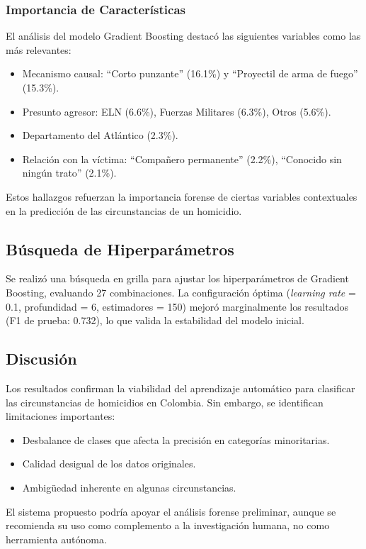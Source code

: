 \documentclass[lettersize,journal]{IEEEtran}
\begin{document}
\subsubsection{Importancia de Características}
El análisis del modelo Gradient Boosting destacó las siguientes variables como las más relevantes:
\begin{itemize}
\item Mecanismo causal: ``Corto punzante'' (16.1\%) y ``Proyectil de arma de fuego'' (15.3\%).
\item Presunto agresor: ELN (6.6\%), Fuerzas Militares (6.3\%), Otros (5.6\%).
\item Departamento del Atlántico (2.3\%).
\item Relación con la víctima: ``Compañero permanente'' (2.2\%), ``Conocido sin ningún trato'' (2.1\%).
\end{itemize}
Estos hallazgos refuerzan la importancia forense de ciertas variables contextuales en la predicción de las circunstancias de un homicidio.

\subsection{Búsqueda de Hiperparámetros}
Se realizó una búsqueda en grilla para ajustar los hiperparámetros de Gradient Boosting, evaluando 27 combinaciones. La configuración óptima (\textit{learning rate} = 0.1, profundidad = 6, estimadores = 150) mejoró marginalmente los resultados (F1 de prueba: 0.732), lo que valida la estabilidad del modelo inicial.

\subsection{Discusión}
Los resultados confirman la viabilidad del aprendizaje automático para clasificar las circunstancias de homicidios en Colombia. Sin embargo, se identifican limitaciones importantes:
\begin{itemize}
\item Desbalance de clases que afecta la precisión en categorías minoritarias.
\item Calidad desigual de los datos originales.
\item Ambigüedad inherente en algunas circunstancias.
\end{itemize}

El sistema propuesto podría apoyar el análisis forense preliminar, aunque se recomienda su uso como complemento a la investigación humana, no como herramienta autónoma.
\end{document}

